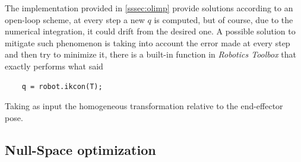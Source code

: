 The implementation provided in \ref{sssec:olimp} provide solutions according to an open-loop scheme, at every step a new $q$ is computed, but of course, due to the numerical integration, it could drift from the desired one. A possible solution to mitigate such phenomenon is taking into account the error made at every step and then try to minimize it, there is a built-in function in \textit{Robotics Toolbox} that exactly performs what said
\begin{lstlisting}
    q = robot.ikcon(T);
\end{lstlisting}
Taking as input the homogeneous transformation relative to the end-effector pose.%
\newpage
\subsection{Null-Space optimization}

